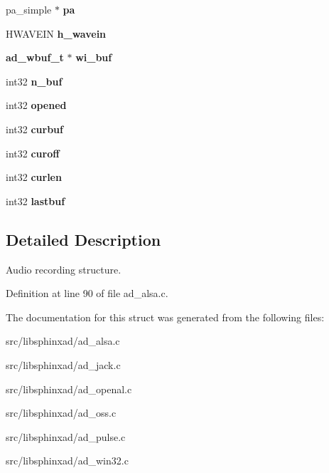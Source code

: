 \begin{DoxyCompactItemize}
\item 
pa\+\_\+simple $\ast$ {\bfseries pa}\label{structad__rec__s_a8ebda5d453f68928e21548739f27ceb9}

\item 
H\+W\+A\+V\+E\+I\+N {\bfseries h\+\_\+wavein}\label{structad__rec__s_a79081fc333f54eff7afdc23404f3ae69}

\item 
{\bf ad\+\_\+wbuf\+\_\+t} $\ast$ {\bfseries wi\+\_\+buf}\label{structad__rec__s_a81d0d2d45fe558b7e7c5504680b15dc5}

\item 
int32 {\bfseries n\+\_\+buf}\label{structad__rec__s_acd8fe38386d84c3e954f2652577c0c7e}

\item 
int32 {\bfseries opened}\label{structad__rec__s_a8f1c8d2056486373a7d87c89e995b8f2}

\item 
int32 {\bfseries curbuf}\label{structad__rec__s_a1eb7456dc028152343c8d538195a8aa3}

\item 
int32 {\bfseries curoff}\label{structad__rec__s_a1c7d3d94fc97bb318cbfe4aa33088b62}

\item 
int32 {\bfseries curlen}\label{structad__rec__s_ab9d6eff8b29d0741ed3b4133a57174ca}

\item 
int32 {\bfseries lastbuf}\label{structad__rec__s_a30b13811b7b97765861b776e29d5d34c}

\end{DoxyCompactItemize}


\subsection{Detailed Description}
Audio recording structure. 

Definition at line 90 of file ad\+\_\+alsa.\+c.



The documentation for this struct was generated from the following files\+:\begin{DoxyCompactItemize}
\item 
src/libsphinxad/ad\+\_\+alsa.\+c\item 
src/libsphinxad/ad\+\_\+jack.\+c\item 
src/libsphinxad/ad\+\_\+openal.\+c\item 
src/libsphinxad/ad\+\_\+oss.\+c\item 
src/libsphinxad/ad\+\_\+pulse.\+c\item 
src/libsphinxad/ad\+\_\+win32.\+c\end{DoxyCompactItemize}
